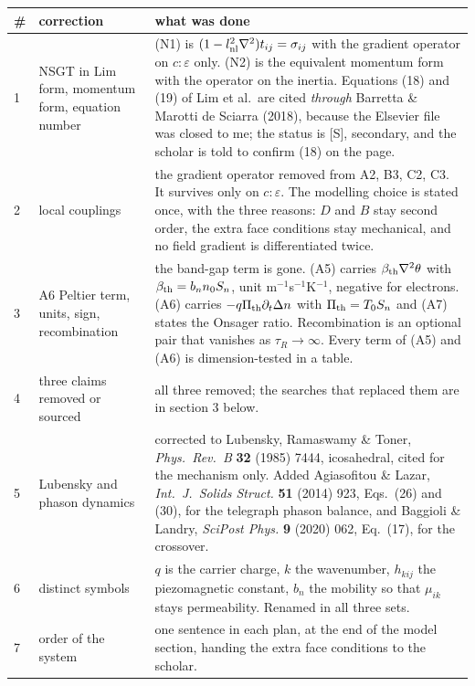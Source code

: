 \documentclass[11pt]{article}
\begin{document}
\begin{center}\footnotesize
\begin{tabular}{p{0.4cm}p{4.6cm}p{8.6cm}}
\toprule
\# & correction & what was done\\
\midrule
1 & NSGT in Lim form, momentum form, equation number & (N1) is $(1-l_{\rm nl}^2\nabla^2)t_{ij}=\sigma_{ij}$ with the gradient operator on $c{:}\varepsilon$ only. (N2) is the equivalent momentum form with the operator on the inertia. Equations (18) and (19) of Lim et al.\ are cited \emph{through} Barretta \& Marotti de Sciarra (2018), because the Elsevier file was closed to me; the status is [S], secondary, and the scholar is told to confirm (18) on the page.\\
2 & local couplings & the gradient operator removed from A2, B3, C2, C3. It survives only on $c{:}\varepsilon$. The modelling choice is stated once, with the three reasons: $D$ and $B$ stay second order, the extra face conditions stay mechanical, and no field gradient is differentiated twice.\\
3 & A6 Peltier term, units, sign, recombination & the band-gap term is gone. (A5) carries $\beta_{\rm th}\nabla^2\theta$ with $\beta_{\rm th}=b_nn_0S_n$, unit m$^{-1}$s$^{-1}$K$^{-1}$, negative for electrons. (A6) carries $-q\Pi_{\rm th}\partial_t\Delta n$ with $\Pi_{\rm th}=T_0S_n$ and (A7) states the Onsager ratio. Recombination is an optional pair that vanishes as $\tau_R\to\infty$. Every term of (A5) and (A6) is dimension-tested in a table.\\
4 & three claims removed or sourced & all three removed; the searches that replaced them are in section 3 below.\\
5 & Lubensky and phason dynamics & corrected to Lubensky, Ramaswamy \& Toner, \emph{Phys.\ Rev.\ B} \textbf{32} (1985) 7444, icosahedral, cited for the mechanism only. Added Agiasofitou \& Lazar, \emph{Int.\ J.\ Solids Struct.} \textbf{51} (2014) 923, Eqs.~(26) and (30), for the telegraph phason balance, and Baggioli \& Landry, \emph{SciPost Phys.} \textbf{9} (2020) 062, Eq.~(17), for the crossover.\\
6 & distinct symbols & $q$ is the carrier charge, $k$ the wavenumber, $h_{kij}$ the piezomagnetic constant, $b_n$ the mobility so that $\mu_{ik}$ stays permeability. Renamed in all three sets.\\
7 & order of the system & one sentence in each plan, at the end of the model section, handing the extra face conditions to the scholar. \\
\bottomrule
\end{tabular}
\end{center}
\end{document}

